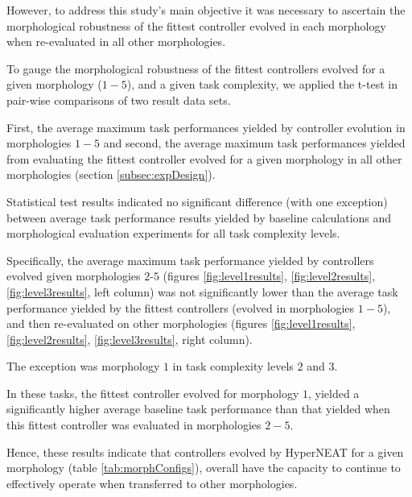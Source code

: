 However, to address this study's main objective it was necessary to ascertain the morphological robustness
of the fittest controller evolved in each morphology when re-evaluated in all other morphologies.

To gauge the morphological robustness of the fittest controllers evolved for a given morphology ($1-5$),
and a given task complexity, we applied the t-test in pair-wise comparisons of two result
data sets.  

First, the average maximum task performances yielded by controller evolution in morphologies
$1-5$ and second, the average maximum task performances yielded from evaluating the fittest controller
evolved for a given morphology in all other morphologies (section \ref{subsec:expDesign}).

Statistical test results indicated no significant difference (with one exception) between average task performance results
yielded by baseline calculations and morphological evaluation experiments for all task complexity levels.

Specifically, the average maximum task performance yielded by controllers evolved given morphologies $2$-$5$
(figures \ref{fig:level1results}, \ref{fig:level2results}, \ref{fig:level3results}, left column) was not
significantly lower than the average task performance yielded by the fittest controllers
(evolved in morphologies $1-5$), and then re-evaluated on other morphologies
(figures \ref{fig:level1results}, \ref{fig:level2results}, \ref{fig:level3results},
right column).  

The exception was morphology $1$ in task complexity levels $2$ and $3$.

In these tasks, the fittest controller evolved for morphology $1$, yielded a significantly higher average
baseline task performance than that yielded when this fittest controller was evaluated in
morphologies $2-5$.


Hence, these results indicate that controllers evolved by HyperNEAT for a given morphology
(table \ref{tab:morphConfigs}), overall have the capacity to continue to effectively operate
when transferred to other morphologies.

